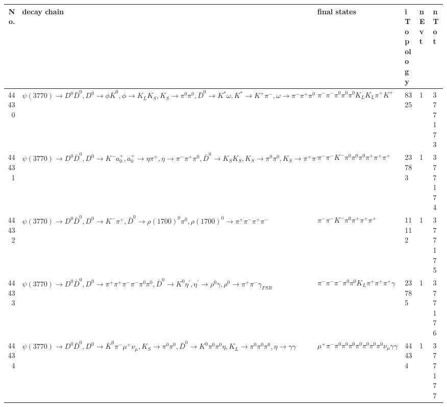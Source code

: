 \begin{table}[htbp] 
\begin{center}
\begin{small}
\begin{tabular}{rlllll}\hline\hline
 No. & decay chain & final states &  iTopology & nEvt & nTot \\\hline
44430&$\psi(3770) \rightarrow D^{0} \bar{D}^{0} , D^{0}  \rightarrow \phi           \bar{K}^{0}   , \phi            \rightarrow K_{L}          K_{S}          , K_{S}           \rightarrow \pi^{0}        \pi^{0}        , \bar{D}^{0}  \rightarrow K^{*}          \omega         , K^{*}           \rightarrow K^{+}          \pi^{-}        , \omega          \rightarrow \pi^{-}        \pi^{+}        \pi^{0}        $&$\pi^{-}        \pi^{-}        \pi^{0}        \pi^{0}        \pi^{0}        K_{L}          K_{L}          \pi^{+}        K^{+}          $& 8325&    1&377173\\
44431&$\psi(3770) \rightarrow D^{0} \bar{D}^{0} , D^{0}  \rightarrow K^{-}          a_{0}^{+}      , a_{0}^{+}       \rightarrow \eta          \pi^{+}        , \eta           \rightarrow \pi^{-}        \pi^{+}        \pi^{0}        , \bar{D}^{0}  \rightarrow K_{S}          K_{S}          , K_{S}           \rightarrow \pi^{0}        \pi^{0}        , K_{S}           \rightarrow \pi^{+}        \pi^{-}        $&$\pi^{-}        \pi^{-}        K^{-}          \pi^{0}        \pi^{0}        \pi^{0}        \pi^{+}        \pi^{+}        \pi^{+}        $&23783&    1&377174\\
44432&$\psi(3770) \rightarrow D^{0} \bar{D}^{0} , D^{0}  \rightarrow K^{-}          \pi^{+}        , \bar{D}^{0}  \rightarrow \rho(1700)^{0} \pi^{0}        , \rho(1700)^{0}  \rightarrow \pi^{+}        \pi^{-}        \pi^{+}        \pi^{-}        $&$\pi^{-}        \pi^{-}        K^{-}          \pi^{0}        \pi^{+}        \pi^{+}        \pi^{+}        $&11112&    1&377175\\
44433&$\psi(3770) \rightarrow D^{0} \bar{D}^{0} , D^{0}  \rightarrow \pi^{+}        \pi^{+}        \pi^{-}        \pi^{-}        \pi^{0}        \pi^{0}        , \bar{D}^{0}  \rightarrow K^{0}          \eta^{\prime} , \eta^{\prime}  \rightarrow \rho^{0}      \gamma       , \rho^{0}       \rightarrow \pi^{+}        \pi^{-}        \gamma_{FSR} $&$\pi^{-}        \pi^{-}        \pi^{-}        \pi^{0}        \pi^{0}        K_{L}          \pi^{+}        \pi^{+}        \pi^{+}        \gamma       $&23785&    1&377176\\
44434&$\psi(3770) \rightarrow D^{0} \bar{D}^{0} , D^{0}  \rightarrow \bar{K}^{0}   \pi^{-}        \mu^{+}      \nu_{\mu}         , K_{S}           \rightarrow \pi^{0}        \pi^{0}        , \bar{D}^{0}  \rightarrow K^{0}          \pi^{0}        \pi^{0}        \eta          , K_{L}           \rightarrow \pi^{0}        \pi^{0}        \pi^{0}        , \eta           \rightarrow \gamma       \gamma       $&$\mu^{+}      \pi^{-}        \pi^{0}        \pi^{0}        \pi^{0}        \pi^{0}        \pi^{0}        \pi^{0}        \pi^{0}        \nu_{\mu}         \gamma       \gamma       $&44434&    1&377177\\

\end{tabular}
\end{small}
\end{center}
\end{table}

